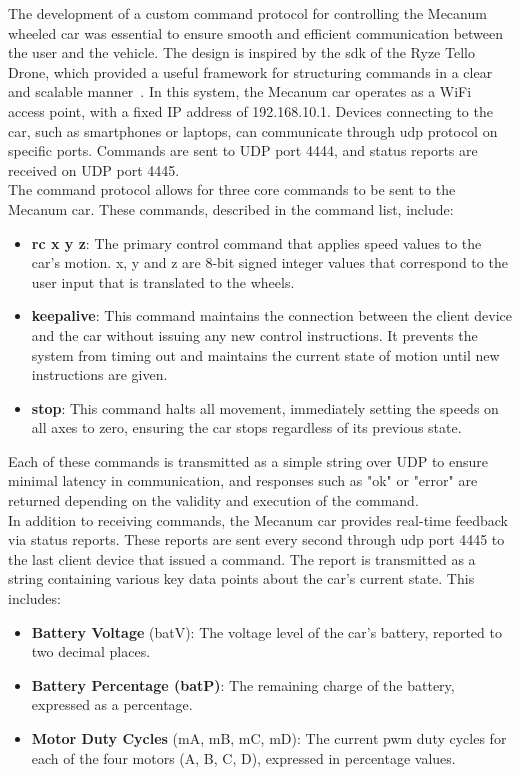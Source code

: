 The development of a custom command protocol for controlling the Mecanum wheeled car was essential to ensure smooth and efficient communication between the user and the vehicle. The design is inspired by the \ac{sdk} of the Ryze Tello Drone, which provided a useful framework for structuring commands in a clear and scalable manner~\cite{ryze.2018}. In this system, the Mecanum car operates as a WiFi access point, with a fixed IP address of 192.168.10.1. Devices connecting to the car, such as smartphones or laptops, can communicate through \ac{udp} protocol on specific ports. Commands are sent to UDP port 4444, and status reports are received on UDP port 4445.\\
The command protocol allows for three core commands to be sent to the Mecanum car. These commands, described in the command list, include:
\begin{itemize}
	\item \textbf{rc x y z}: The primary control command that applies speed values to the car's motion. x, y and z are 8-bit signed integer values that correspond to the user input that is translated to the wheels.
	\item \textbf{keepalive}: This command maintains the connection between the client device and the car without issuing any new control instructions. It prevents the system from timing out and maintains the current state of motion until new instructions are given.
	\item \textbf{stop}: This command halts all movement, immediately setting the speeds on all axes to zero, ensuring the car stops regardless of its previous state.
\end{itemize}
Each of these commands is transmitted as a simple string over UDP to ensure minimal latency in communication, and responses such as "ok" or "error" are returned depending on the validity and execution of the command.\\
In addition to receiving commands, the Mecanum car provides real-time feedback via status reports. These reports are sent every second through \ac{udp} port 4445 to the last client device that issued a command. The report is transmitted as a string containing various key data points about the car's current state. This includes:
\begin{itemize}
	\item \textbf{Battery Voltage} (batV): The voltage level of the car’s battery, reported to two decimal places.
	\item \textbf{Battery Percentage (batP)}: The remaining charge of the battery, expressed as a percentage.
	\item \textbf{Motor Duty Cycles} (mA, mB, mC, mD): The current \ac{pwm} duty cycles for each of the four motors (A, B, C, D), expressed in percentage values.
\end{itemize}
